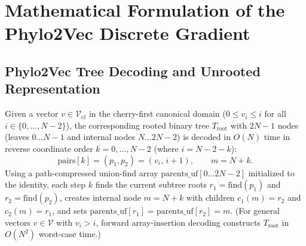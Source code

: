 \documentclass[11pt,a4paper]{article}
\theoremstyle{definition}
\begin{document}
\section{Mathematical Formulation of the Phylo2Vec Discrete Gradient}
\label{sec:math}

\subsection{Phylo2Vec Tree Decoding and Unrooted Representation}
Given a vector $v \in \mathcal{V}_{\text{cf}}$ in the cherry-first canonical domain ($0 \le v_i \le i$ for all $i \in \{0, \dots, N-2\}$), the corresponding rooted binary tree $T_{\text{root}}$ with $2N-1$ nodes (leaves $0 \dots N-1$ and internal nodes $N \dots 2N-2$) is decoded in $O(N)$ time in reverse coordinate order $k = 0, \dots, N-2$ (where $i = N - 2 - k$):
\begin{equation}
\text{pairs}[k] = (p_1, p_2) = (v_i, \, i + 1), \qquad m = N + k.
\end{equation}
Using a path-compressed union-find array $\text{parents\_uf}[0 \dots 2N-2]$ initialized to the identity, each step $k$ finds the current subtree roots $r_1 = \text{find}(p_1)$ and $r_2 = \text{find}(p_2)$, creates internal node $m = N + k$ with children $c_1(m) = r_2$ and $c_2(m) = r_1$, and sets $\text{parents\_uf}[r_1] = \text{parents\_uf}[r_2] = m$. (For general vectors $v \in \mathcal{V}$ with $v_i > i$, forward array-insertion decoding constructs $T_{\text{root}}$ in $O(N^2)$ worst-case time.)
\end{document}

